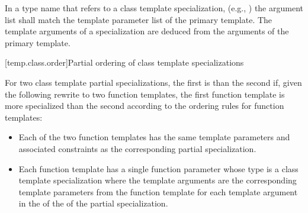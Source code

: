 \pnum
In a type name that refers to a class template specialization, (e.g.,
)
the argument list shall match the template parameter list of the primary
template.
The template arguments of a specialization are deduced from the arguments
of the primary template.

[temp.class.order]{Partial ordering of class template specializations}

\pnum
{}%
For two class template partial specializations,
the first is  than the second if, given the following
rewrite to two function templates, the first function template is more
specialized than the second according to the ordering rules for function
templates:

\begin{itemize}
\item
Each of the two
function templates has the same template parameters
and associated constraints
as the corresponding partial specialization.
\item
Each function template
has a single function parameter
whose type is a class template specialization where the template arguments
are the corresponding template parameters from the function template
for each template argument
in the 
of the 
of the partial specialization.
\end{itemize}

